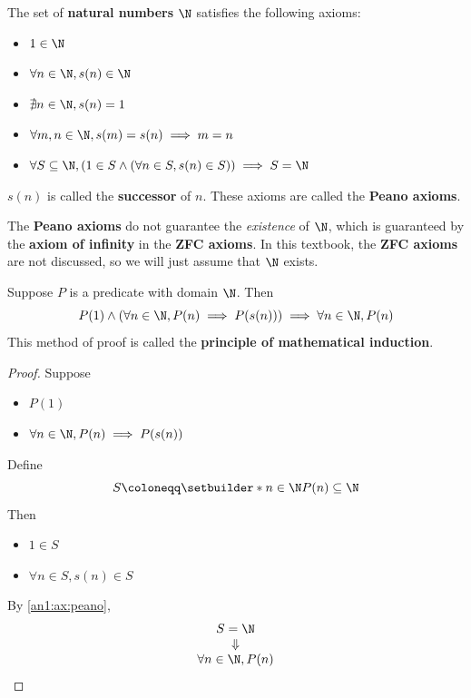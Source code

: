 \begin{axiom} \label{an1:ax:peano}
  The set of \textbf{natural numbers} $\N$ satisfies the following axioms:
  \begin{itemize}
    \item $1 \in \N$
    \item $\forall n \in \N, s(n) \in \N$
    \item $\nexists n \in \N, s(n) = 1$
    \item $\forall m, n \in \N, s(m) = s(n) \implies m = n$
    \item $\forall S \subseteq \N, (1 \in S \land (\forall n \in S, s(n) \in S)) \implies S = \N$
  \end{itemize}
  $s(n)$ is called the \textbf{successor} of $n$. These axioms are called the \textbf{Peano axioms}.
\end{axiom}

\begin{remark}
  The \textbf{Peano axioms} do not guarantee the \emph{existence} of $\N$, which is guaranteed by the
  \textbf{axiom of infinity} in the \textbf{ZFC axioms}. In this textbook, the \textbf{ZFC axioms}
  are not discussed, so we will just assume that $\N$ exists.
\end{remark}

\begin{theorem} \label{an1:thm:mathematical-induction}
  Suppose $P$ is a predicate with domain $\N$. Then
  \[
    P(1) \land (\forall n \in \N, P(n) \implies P(s(n))) \implies \forall n \in \N, P(n)
  \]
  This method of proof is called the \textbf{principle of mathematical induction}.
\end{theorem}

\begin{proof}
  Suppose
  \begin{itemize}
    \item $P(1)$
    \item $\forall n \in \N, P(n) \implies P(s(n))$
  \end{itemize}
  Define
  \[
    S \coloneqq \setbuilder*{n \in \N}{P(n)} \subseteq \N
  \]
  Then
  \begin{itemize}
    \item $1 \in S$
    \item $\forall n \in S, s(n) \in S$
  \end{itemize}
  By \cref{an1:ax:peano},
  \[
    \begin{array}{c}
      S = \N     \\
      \Downarrow \\
      \forall n \in \N, P(n)
    \end{array}
  \]
\end{proof}

